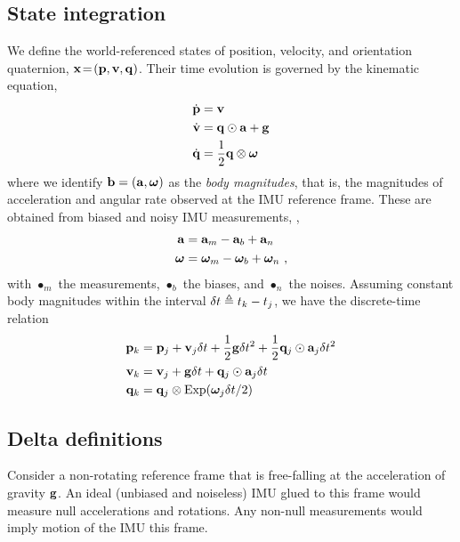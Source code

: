 \subsection{State integration}

We define the world-referenced states of position, velocity, and orientation quaternion, ${\bf x}\!=\!({\bf p},{\bf v},{\bf q})$. 
Their time evolution is governed by the kinematic equation,
%
\begin{align}\label{equ:cont_basic}
\begin{split}
\dot{{\bf p}} &= {\bf v} \\
\dot{{\bf v}} &= {\bf q}\odot{\bf a} + {\bf g} \\
\dot{{\bf q}} &= \frac12{\bf q}\otimes{{\bm \omega}} 
\end{split}
\end{align}
%
where we identify ${\bf b}=({\bf a},{{\bm \omega}})$ as the \emph{body magnitudes}, that is, the magnitudes of acceleration and angular rate observed at the IMU reference frame. These are obtained from biased and noisy IMU measurements, \ie,
%
\begin{align}\label{equ:body}
\begin{split}
{\bf a} &= {\bf a}_m - {{\bf a}_b} + {\bf a}_n \\
{{\bm \omega}} &= {{\bm \omega}}_m - {{{\bm \omega}}_b} + {{\bm \omega}}_n 
~,
\end{split}
\end{align}
%
with $\bullet_m$ the measurements, $\bullet_b$ the biases, and $\bullet_n$ the noises.
Assuming constant body magnitudes within the interval $\delta t\triangleq t_k-t_j$, we have the discrete-time relation
%
\begin{align}\label{equ:g_second_order_integration}
\begin{split}
{\bf p}_{k} &= {\bf p}_j + {\bf v}_j\delta t  + \frac12{\bf g}\delta t^2 + \frac12{\bf q}_j\odot{\bf a}_j\delta t^2 \\
{\bf v}_{k} &= {\bf v}_j + {\bf g}\delta t + {\bf q}_j\odot{\bf a}_j\delta t \\
{\bf q}_{k} &= {\bf q}_j\otimes\operatorname*{Exp}({{\bm \omega}}_j\delta t/2) 
\end{split}
\end{align}


\subsection{Delta definitions}

Consider a non-rotating reference frame that is free-falling at the acceleration of gravity ${\bf g}$. 
An ideal (unbiased and noiseless) IMU glued to this frame would measure null accelerations and rotations. 
Any non-null measurements would imply motion of the IMU \wrt this frame.

